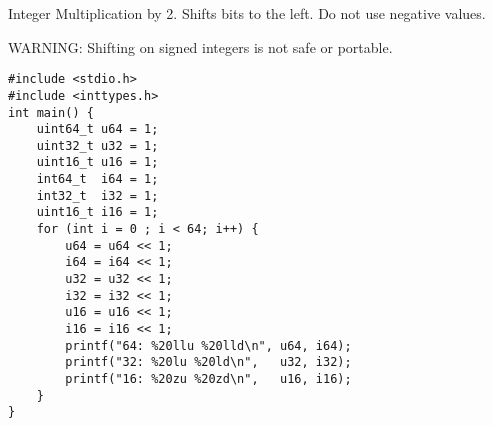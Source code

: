 \documentclass[11pt]{article}
\begin{document}
Integer Multiplication by 2. Shifts bits to the left. Do not use negative values.

WARNING: Shifting on signed integers is not safe or portable.


\begin{verbatim}
#include <stdio.h>
#include <inttypes.h>
int main() {
    uint64_t u64 = 1;
    uint32_t u32 = 1;
    uint16_t u16 = 1;
    int64_t  i64 = 1;
    int32_t  i32 = 1;
    uint16_t i16 = 1;
    for (int i = 0 ; i < 64; i++) {
        u64 = u64 << 1;
        i64 = i64 << 1;
        u32 = u32 << 1;
        i32 = i32 << 1;
        u16 = u16 << 1;
        i16 = i16 << 1;
        printf("64: %20llu %20lld\n", u64, i64);
        printf("32: %20lu %20ld\n",   u32, i32);
        printf("16: %20zu %20zd\n",   u16, i16);
    }
}
\end{verbatim}
\end{document}
